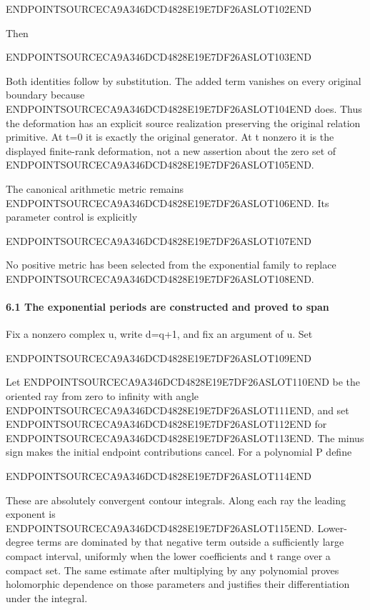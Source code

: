 ENDPOINTSOURCECA9A346DCD4828E19E7DF26ASLOT102END

Then

ENDPOINTSOURCECA9A346DCD4828E19E7DF26ASLOT103END

Both identities follow by substitution. The added term vanishes on every original boundary because ENDPOINTSOURCECA9A346DCD4828E19E7DF26ASLOT104END does. Thus the deformation has an explicit source realization preserving the original relation primitive. At t=0 it is exactly the original generator. At t nonzero it is the displayed finite-rank deformation, not a new assertion about the zero set of ENDPOINTSOURCECA9A346DCD4828E19E7DF26ASLOT105END.

The canonical arithmetic metric remains ENDPOINTSOURCECA9A346DCD4828E19E7DF26ASLOT106END. Its parameter control is explicitly

ENDPOINTSOURCECA9A346DCD4828E19E7DF26ASLOT107END

No positive metric has been selected from the exponential family to replace ENDPOINTSOURCECA9A346DCD4828E19E7DF26ASLOT108END.

\paragraph{6.1 The exponential periods are constructed and proved to span}\label{endpoint-exponential_original--the-exponential-periods-are-constructed-and-proved-to-span}

Fix a nonzero complex u, write d=q+1, and fix an argument of u. Set

ENDPOINTSOURCECA9A346DCD4828E19E7DF26ASLOT109END

Let ENDPOINTSOURCECA9A346DCD4828E19E7DF26ASLOT110END be the oriented ray from zero to infinity with angle ENDPOINTSOURCECA9A346DCD4828E19E7DF26ASLOT111END, and set ENDPOINTSOURCECA9A346DCD4828E19E7DF26ASLOT112END for ENDPOINTSOURCECA9A346DCD4828E19E7DF26ASLOT113END. The minus sign makes the initial endpoint contributions cancel. For a polynomial P define

ENDPOINTSOURCECA9A346DCD4828E19E7DF26ASLOT114END

These are absolutely convergent contour integrals. Along each ray the leading exponent is ENDPOINTSOURCECA9A346DCD4828E19E7DF26ASLOT115END. Lower-degree terms are dominated by that negative term outside a sufficiently large compact interval, uniformly when the lower coefficients and t range over a compact set. The same estimate after multiplying by any polynomial proves holomorphic dependence on those parameters and justifies their differentiation under the integral.

